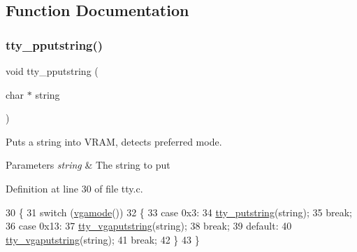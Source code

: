 \subsection{Function Documentation}
\mbox{\label{a00107_ade960b1320324706aac6c00cc6b1b2fe_ade960b1320324706aac6c00cc6b1b2fe}} 
\subsubsection{\texorpdfstring{tty\+\_\+pputstring()}{tty\_pputstring()}}
{\footnotesize\ttfamily void tty\+\_\+pputstring (\begin{DoxyParamCaption}\item[{char $\ast$}]{string }\end{DoxyParamCaption})}



Puts a string into V\+R\+AM, detects preferred mode. 


\begin{DoxyParams}{Parameters}
{\em string} & The string to put \\
\hline
\end{DoxyParams}


Definition at line 30 of file tty.\+c.


\begin{DoxyCode}
30                                   \{
31     \textcolor{keywordflow}{switch} (\hyperlink{a00014_af6d170c9401ea8f94d4c5cf09347cca7_af6d170c9401ea8f94d4c5cf09347cca7}{vgamode}())
32     \{
33     \textcolor{keywordflow}{case} 0x3:
34         \hyperlink{a00107_a2ebb962f457a2677d70285d1c0f9be12_a2ebb962f457a2677d70285d1c0f9be12}{tty\_putstring}(\textcolor{keywordtype}{string});
35         \textcolor{keywordflow}{break};
36     \textcolor{keywordflow}{case} 0x13:
37         \hyperlink{a00107_a13ff2c06d56753c5666ca56cb2d81100_a13ff2c06d56753c5666ca56cb2d81100}{tty\_vgaputstring}(\textcolor{keywordtype}{string});
38         \textcolor{keywordflow}{break};
39     \textcolor{keywordflow}{default}:
40         \hyperlink{a00107_a13ff2c06d56753c5666ca56cb2d81100_a13ff2c06d56753c5666ca56cb2d81100}{tty\_vgaputstring}(\textcolor{keywordtype}{string});
41         \textcolor{keywordflow}{break};
42     \}
43 \}
\end{DoxyCode}
\mbox{\label{a00107_a2ebb962f457a2677d70285d1c0f9be12_a2ebb962f457a2677d70285d1c0f9be12}} 

